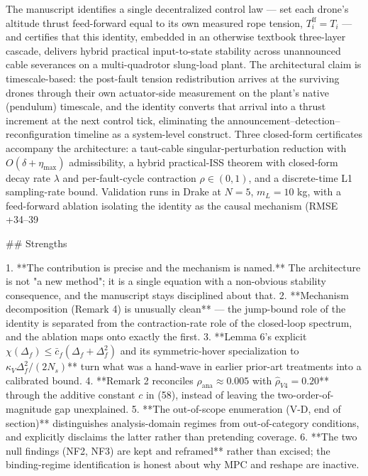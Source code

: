 The manuscript identifies a single decentralized control law — set each drone's altitude thrust feed-forward equal to its own measured rope tension, $T_i^{\mathrm{ff}} = T_i$ — and certifies that this identity, embedded in an otherwise textbook three-layer cascade, delivers hybrid practical input-to-state stability across unannounced cable severances on a multi-quadrotor slung-load plant. The architectural claim is timescale-based: the post-fault tension redistribution arrives at the surviving drones through their own actuator-side measurement on the plant's native (pendulum) timescale, and the identity converts that arrival into a thrust increment at the next control tick, eliminating the announcement–detection–reconfiguration timeline as a system-level construct. Three closed-form certificates accompany the architecture: a taut-cable singular-perturbation reduction with $O(\delta + \eta_{\max})$ admissibility, a hybrid practical-ISS theorem with closed-form decay rate $\lambda$ and per-fault-cycle contraction $\rho \in (0,1)$, and a discrete-time L1 sampling-rate bound. Validation runs in Drake at $N=5$, $m_L=10$ kg, with a feed-forward ablation isolating the identity as the causal mechanism (RMSE +34–39%

## Strengths

1. **The contribution is precise and the mechanism is named.** The architecture is not "a new method"; it is a single equation with a non-obvious stability consequence, and the manuscript stays disciplined about that.
2. **Mechanism decomposition (Remark 4) is unusually clean** — the jump-bound role of the identity is separated from the contraction-rate role of the closed-loop spectrum, and the ablation maps onto exactly the first.
3. **Lemma 6's explicit $\chi(\Delta_f) \le \bar c_f(\Delta_f + \Delta_f^2)$ and its symmetric-hover specialization to $\kappa_V \Delta_f^2/(2N_s)$** turn what was a hand-wave in earlier prior-art treatments into a calibrated bound.
4. **Remark 2 reconciles $\rho_{\mathrm{ana}} \approx 0.005$ with $\hat\rho_{V4} = 0.20$** through the additive constant $c$ in (58), instead of leaving the two-order-of-magnitude gap unexplained.
5. **The out-of-scope enumeration (V-D, end of section)** distinguishes analysis-domain regimes from out-of-category conditions, and explicitly disclaims the latter rather than pretending coverage.
6. **The two null findings (NF2, NF3) are kept and reframed** rather than excised; the binding-regime identification is honest about why MPC and reshape are inactive.

